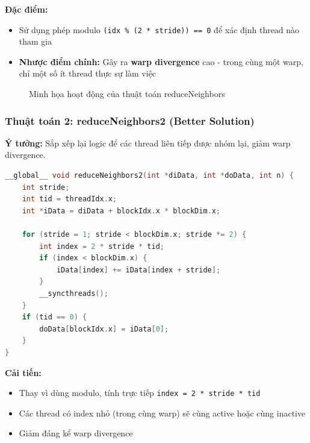 \documentclass[12pt,a4paper]{article}
\begin{document}
\textbf{Đặc điểm:}
\begin{itemize}
    \item Sử dụng phép modulo \texttt{(idx \% (2 * stride)) == 0} để xác định thread nào tham gia
    \item \textbf{Nhược điểm chính:} Gây ra \textbf{warp divergence} cao - trong cùng một warp, chỉ một số ít thread thực sự làm việc
\end{itemize}

\begin{figure}[h]
    \centering
    \caption{Minh họa hoạt động của thuật toán reduceNeighbors}
    \label{fig:reduce_neighbors}
\end{figure}

\subsubsection{Thuật toán 2: reduceNeighbors2 (Better Solution)}

\textbf{Ý tưởng:} Sắp xếp lại logic để các thread liên tiếp được nhóm lại, giảm warp divergence.

\begin{lstlisting}[language=C++, caption=Kernel reduceNeighbors2]
__global__ void reduceNeighbors2(int *diData, int *doData, int n) {
    int stride;
    int tid = threadIdx.x;
    int *iData = diData + blockIdx.x * blockDim.x;

    for (stride = 1; stride < blockDim.x; stride *= 2) {
        int index = 2 * stride * tid;
        if (index < blockDim.x) {
            iData[index] += iData[index + stride];
        }
        __syncthreads();
    }
    if (tid == 0) {
        doData[blockIdx.x] = iData[0];
    }
}
\end{lstlisting}

\textbf{Cải tiến:}
\begin{itemize}
    \item Thay vì dùng modulo, tính trực tiếp \texttt{index = 2 * stride * tid}
    \item Các thread có index nhỏ (trong cùng warp) sẽ cùng active hoặc cùng inactive
    \item Giảm đáng kể warp divergence
\end{itemize}
\end{document}
